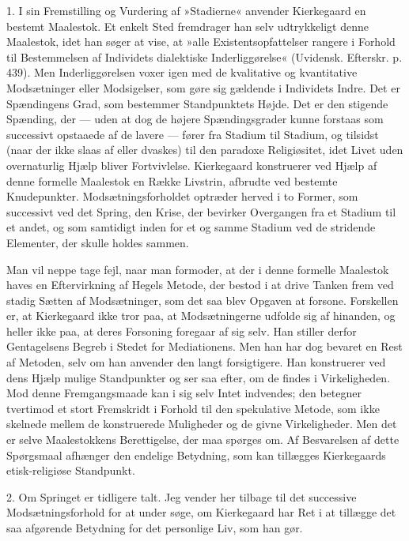 \documentclass[12pt,a4paper,openany]{book}
\newcommand{\opage}[1]{\marginnote{\footnotesize\textit{[#1]}}}
\begin{document}
1. I sin Fremstilling og Vurdering af »Stadierne«
anvender Kierkegaard en bestemt Maalestok. Et enkelt
Sted fremdrager han selv udtrykkeligt denne Maalestok,
idet han søger at vise, at »alle Existentsopfattelser rangere
i Forhold til Bestemmelsen af Individets dialektiske
Inderliggørelse« (Uvidensk. Efterskr. p. 439). Men Inderliggørelsen
voxer igen med de kvalitative og kvantitative
Modsætninger eller Modsigelser, som gøre sig gældende
i Individets Indre. Det er Spændingens Grad, som bestemmer
Standpunktets Højde. Det er den stigende
\opage{120}Spænding, der --- uden at dog de højere Spændingsgrader
kunne forstaas som successivt opstaaede af de
lavere --- fører fra Stadium til Stadium, og tilsidst (naar
der ikke slaas af eller dvaskes) til den paradoxe Religiøsitet,
idet Livet uden overnaturlig Hjælp bliver Fortvivlelse.
Kierkegaard konstruerer ved Hjælp af denne formelle
Maalestok en Række Livstrin, afbrudte ved bestemte
Knudepunkter. Modsætningsforholdet optræder herved i
to Former, som successivt ved det Spring, den Krise, der
bevirker Overgangen fra et Stadium til et andet, og som
samtidigt inden for et og samme Stadium ved de stridende
Elementer, der skulle holdes sammen.

Man vil neppe tage fejl, naar man formoder, at der
i denne formelle Maalestok haves en Eftervirkning af
Hegels Metode, der bestod i at drive Tanken frem ved
stadig Sætten af Modsætninger, som det saa blev Opgaven
at forsone. Forskellen er, at Kierkegaard ikke tror paa,
at Modsætningerne udfolde sig af hinanden, og heller
ikke paa, at deres Forsoning foregaar af sig selv. Han
stiller derfor Gentagelsens Begreb i Stedet for Mediationens.
Men han har dog bevaret en Rest af Metoden,
selv om han anvender den langt forsigtigere. Han konstruerer
ved dens Hjælp mulige Standpunkter og ser saa
efter, om de findes i Virkeligheden. Mod denne Fremgangsmaade
kan i sig selv Intet indvendes; den betegner
tvertimod et stort Fremskridt i Forhold til den spekulative
Metode, som ikke skelnede mellem de konstruerede
Muligheder og de givne Virkeligheder. Men det er selve
Maalestokkens Berettigelse, der maa spørges om. Af
Besvarelsen af dette Spørgsmaal afhænger den endelige
Betydning, som kan tillægges Kierkegaards etisk-religiøse
Standpunkt.

2. Om Springet er tidligere talt. Jeg vender her
tilbage til det successive Modsætningsforhold for at under%
\opage{121}søge, om Kierkegaard har Ret i at tillægge det saa
afgørende Betydning for det personlige Liv, som han gør.
\end{document}
